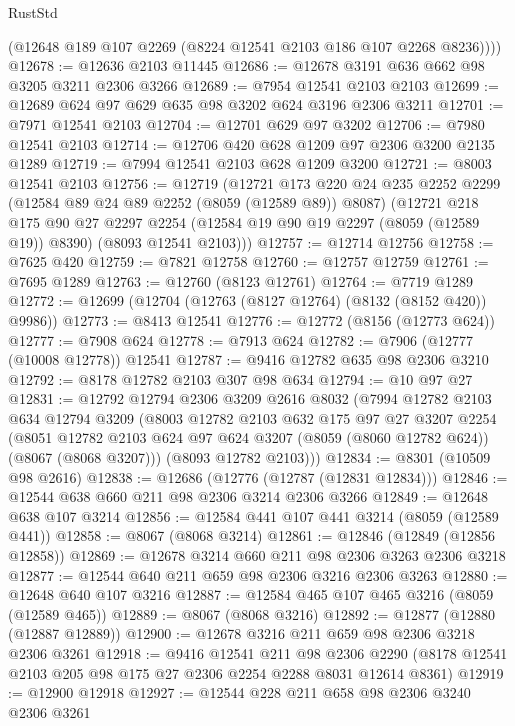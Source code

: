 \begin{lexlean}{RustStd}
\begin{coremodule}
{\begin{coremodule}
{{{{{{{{{{{{{{{{{{{{{{{{{{{{{{{{{{        (@12648 @189 @107 @2269 (@8224 @12541 @2103 @186 @107 @2268 @8236))))
@12678 := @12636 @2103 @11445
@12686 := @12678 @3191 @636 @662 @98 @3205 @3211 @2306 @3266
@12689 := @7954 @12541 @2103 @2103
@12699 := @12689 @624 @97 @629 @635 @98 @3202 @624 @3196 @2306 @3211
@12701 := @7971 @12541 @2103
@12704 := @12701 @629 @97 @3202
@12706 := @7980 @12541 @2103
@12714 := @12706 @420 @628 @1209 @97 @2306 @3200 @2135 @1289
@12719 := @7994 @12541 @2103 @628 @1209 @3200
@12721 := @8003 @12541 @2103
@12756 := @12719
    (@12721
      @173
      @220
      @24
      @235
      @2252
      @2299
      (@12584 @89 @24 @89 @2252 (@8059 (@12589 @89)) @8087)
      (@12721
        @218
        @175
        @90
        @27
        @2297
        @2254
        (@12584 @19 @90 @19 @2297 (@8059 (@12589 @19)) @8390)
        (@8093 @12541 @2103)))
@12757 := @12714 @12756
@12758 := @7625 @420
@12759 := @7821 @12758
@12760 := @12757 @12759
@12761 := @7695 @1289
@12763 := @12760 (@8123 @12761)
@12764 := @7719 @1289
@12772 := @12699 (@12704 (@12763 (@8127 @12764) (@8132 (@8152 @420)) @9986))
@12773 := @8413 @12541
@12776 := @12772 (@8156 (@12773 @624))
@12777 := @7908 @624
@12778 := @7913 @624
@12782 := @7906 (@12777 (@10008 @12778)) @12541
@12787 := @9416 @12782 @635 @98 @2306 @3210
@12792 := @8178 @12782 @2103 @307 @98 @634
@12794 := @10 @97 @27
@12831 := @12792
    @12794
    @2306
    @3209
    @2616
    @8032
    (@7994
      @12782
      @2103
      @634
      @12794
      @3209
      (@8003
        @12782
        @2103
        @632
        @175
        @97
        @27
        @3207
        @2254
        (@8051 @12782 @2103 @624 @97 @624 @3207 (@8059 (@8060 @12782 @624)) (@8067 (@8068 @3207)))
        (@8093 @12782 @2103)))
@12834 := @8301 (@10509 @98 @2616)
@12838 := @12686 (@12776 (@12787 (@12831 @12834)))
@12846 := @12544 @638 @660 @211 @98 @2306 @3214 @2306 @3266
@12849 := @12648 @638 @107 @3214
@12856 := @12584 @441 @107 @441 @3214 (@8059 (@12589 @441))
@12858 := @8067 (@8068 @3214)
@12861 := @12846 (@12849 (@12856 @12858))
@12869 := @12678 @3214 @660 @211 @98 @2306 @3263 @2306 @3218
@12877 := @12544 @640 @211 @659 @98 @2306 @3216 @2306 @3263
@12880 := @12648 @640 @107 @3216
@12887 := @12584 @465 @107 @465 @3216 (@8059 (@12589 @465))
@12889 := @8067 (@8068 @3216)
@12892 := @12877 (@12880 (@12887 @12889))
@12900 := @12678 @3216 @211 @659 @98 @2306 @3218 @2306 @3261
@12918 := @9416
    @12541
    @211
    @98
    @2306
    @2290
    (@8178 @12541 @2103 @205 @98 @175 @27 @2306 @2254 @2288 @8031 @12614 @8361)
@12919 := @12900 @12918
@12927 := @12544 @228 @211 @658 @98 @2306 @3240 @2306 @3261
}}}}}}}}}}}}}}}}}}}}}}}}}}}}}}}}}}
\end{coremodule}}
\end{coremodule}
\end{lexlean}
